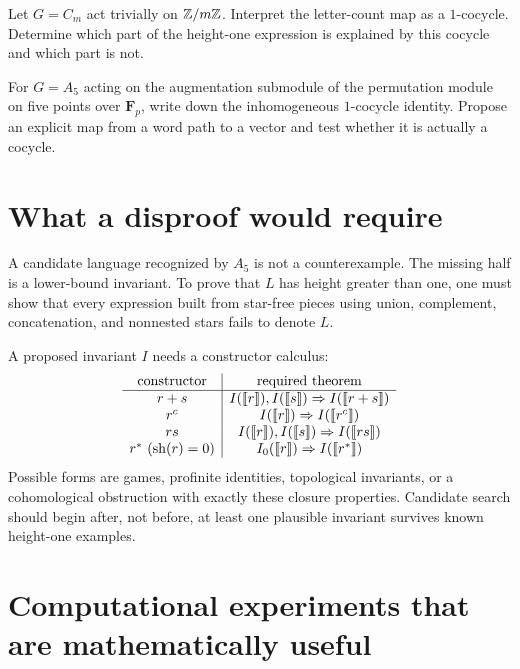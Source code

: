 \documentclass{amsart}
\begin{document}
\begin{exercise}
Let $G=C_m$ act trivially on $\mathbb{Z}/m\mathbb{Z}$.  Interpret the letter-count map as a $1$-cocycle.  Determine which part of the height-one expression is explained by this cocycle and which part is not.
\end{exercise}

\begin{exercise}
For $G=A_5$ acting on the augmentation submodule of the permutation module on five points over $\mathbf F_p$, write down the inhomogeneous $1$-cocycle identity.  Propose an explicit map from a word path to a vector and test whether it is actually a cocycle.
\end{exercise}

\section{What a disproof would require}

A candidate language recognized by $A_5$ is not a counterexample.  The missing half is a lower-bound invariant.  To prove that $L$ has height greater than one, one must show that every expression built from star-free pieces using union, complement, concatenation, and nonnested stars fails to denote $L$.

A proposed invariant $I$ needs a constructor calculus:
\[
\begin{array}{c|c}
\text{constructor} & \text{required theorem}\\
\hline
r+s & I(\llbracket r\rrbracket),I(\llbracket s\rrbracket)\Rightarrow I(\llbracket r+s\rrbracket)\\
r^c & I(\llbracket r\rrbracket)\Rightarrow I(\llbracket r^c\rrbracket)\\
rs & I(\llbracket r\rrbracket),I(\llbracket s\rrbracket)\Rightarrow I(\llbracket rs\rrbracket)\\
r^\ast\ (\operatorname{sh}(r)=0) & I_0(\llbracket r\rrbracket)\Rightarrow I(\llbracket r^\ast\rrbracket)
\end{array}
\]
Possible forms are games, profinite identities, topological invariants, or a cohomological obstruction with exactly these closure properties.  Candidate search should begin after, not before, at least one plausible invariant survives known height-one examples.

\section{Computational experiments that are mathematically useful}
\end{document}
